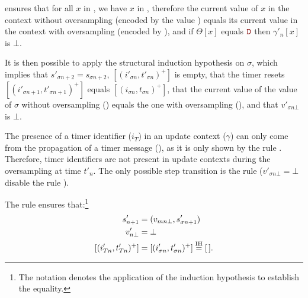 \begin{skippableproof}
     ensures that for all $x$ in
    \depSet{\sigma}, we have $x$ in , therefore the current value of $x$ in
    the context without oversampling (encoded by the value )
    equals its current value in the context with oversampling (encoded by
    ), and
    if $\Theta[x]$ equals $\dType$ then $\gamma'_n[x]$ is $\bot$.

    It is then possible to apply the structural induction hypothesis on $\sigma$, which implies that
    $s'_{\sigma n+2} = s_{\sigma n+2}$, $[(i'_{\sigma n}, t'_{\sigma n})^+]$ is empty, that the
    timer resets $[(i'_{\sigma n+1}, t'_{\sigma n+1})^+]$ equals $[(i_{\sigma n}, t_{\sigma n})^+]$,
    that the current value of the value of $\sigma$ without oversampling () equals the one with oversampling (), and that $v'_{\sigma n\bot}$ is $\bot$.

    The presence of a timer identifier ($i_T$) in an update context ($\gamma$) can only come from
    the propagation of a timer message (), as it is only shown by the rule
    .
    Therefore, timer identifiers are not present in update contexts during the oversampling at time
    $t'_n$. The only possible step transition is the rule
     ($v'_{\sigma n\bot} = \bot$ disable
    the rule ).

    The rule  ensures that:\footnote{The notation  denotes the application of the induction hypothesis to establish the equality.}
    \begin{align*}
        s'_{n+1}               & = (v_{mn\bot}, s'_{\sigma n+1})                            \\
        v'_{n\bot}             & = \bot                                                     \\
        [(i'_{Tn}, t'_{Tn})^+] & = [(i'_{\sigma n}, t'_{\sigma n})^+] \overset{\mathrm{IH}}{=} [\,].
    \end{align*}


\end{skippableproof}
